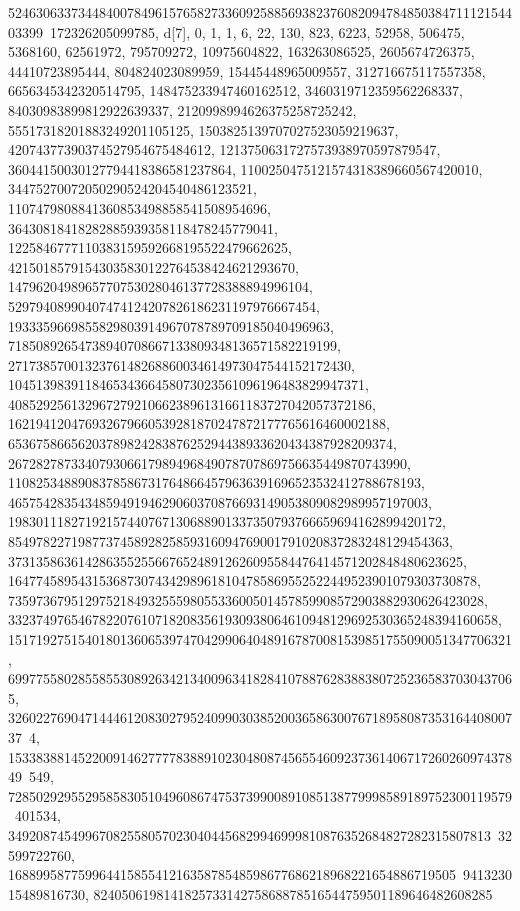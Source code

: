 {{{52463063373448400784961576582733609258856938237608209478485038471112154403399\
172326205099785}}, {d[7], {0, 1, 1, 6, 22, 130, 823, 6223, 52958, 506475, 
   5368160, 62561972, 795709272, 10975604822, 163263086525, 2605674726375, 
   44410723895444, 804824023089959, 15445448965009557, 312716675117557358, 
   6656345342320514795, 148475233947460162512, 3460319712359562268337, 
   84030983899812922639337, 2120998994626375258725242, 
   55517318201883249201105125, 1503825139707027523059219637, 
   42074377390374527954675484612, 1213750631727573938970597879547, 
   36044150030127794418386581237864, 1100250475121574318389660567420010, 
   34475270072050290524204540486123521, 
   1107479808841360853498858541508954696, 
   36430818418282885939358118478245779041, 
   1225846777110383159592668195522479662625, 
   42150185791543035830122764538424621293670, 
   1479620498965770753028046137728388894996104, 
   52979408990407474124207826186231197976667454, 
   1933359669855829803914967078789709185040496963, 
   71850892654738940708667133809348136571582219199, 
   2717385700132376148268860034614973047544152172430, 
   104513983911846534366458073023561096196483829947371, 
   4085292561329672792106623896131661183727042057372186, 
   162194120476932679660539281870247872177765616460002188, 
   6536758665620378982428387625294438933620434387928209374, 
   267282787334079306617989496849078707869756635449870743990, 
   11082534889083785867317648664579636391696523532412788678193, 
   465754283543485949194629060370876693149053809082989957197003, 
   19830111827192157440767130688901337350793766659694162899420172, 
   854978227198773745892825859316094769001791020837283248129454363, 
   37313586361428635525566765248912626095584476414571202848480623625, 
   1647745895431536873074342989618104785869552522449523901079303730878, 
   73597367951297521849325559805533600501457859908572903882930626423028, 
   3323749765467822076107182083561930938064610948129692530365248394160658, 
   151719275154018013606539747042990640489167870081539851755090051347706321, 
   6997755802855855308926342134009634182841078876283883807252365837030437065, 
   32602276904714446120830279524099030385200365863007671895808735316440800737\
4, 
   15338388145220091462777783889102304808745655460923736140671726026097437849\
549, 728502929552958583051049608674753739900891085138779998589189752300119579\
401534, 349208745499670825580570230404456829946999810876352684827282315807813\
32599722760, 1688995877599644158554121635878548598677686218968221654886719505\
941323015489816730, 824050619814182573314275868878516544759501189646482608285\
}}}
